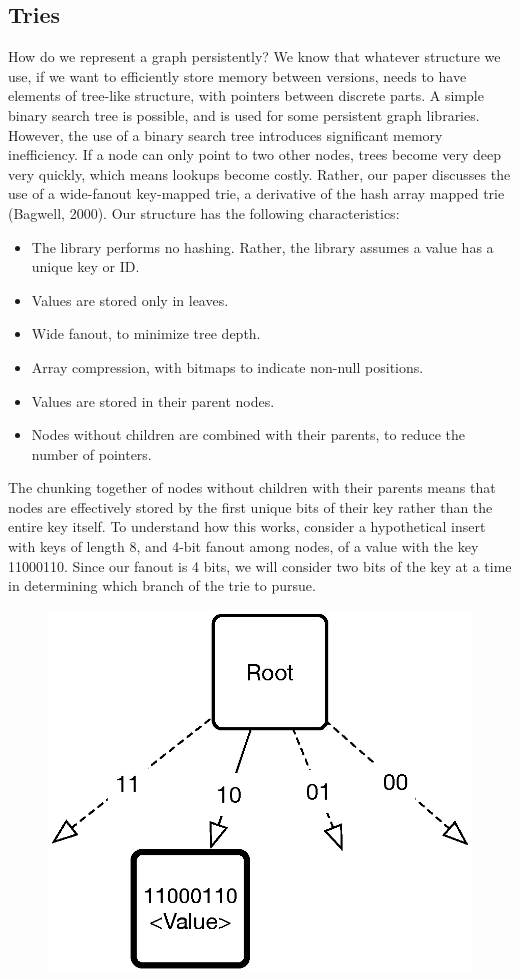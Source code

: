 \documentclass[preprint]{sigplanconf}
\begin{document}
\subsection{Tries}
How do we represent a graph persistently? We know that whatever structure we use, if we want to efficiently store memory between versions, needs to have elements of tree-like structure, with pointers between discrete parts.
A simple binary search tree is possible, and is used for some persistent graph libraries.
However, the use of a binary search tree introduces significant memory inefficiency.
If a node can only point to two other nodes, trees become very deep very quickly, which means lookups become costly.
Rather, our paper discusses the use of a wide-fanout key-mapped trie, a derivative of the hash array mapped trie (Bagwell, 2000).
Our structure has the following characteristics:
\begin{itemize}
\item The library performs no hashing. Rather, the library assumes a value has a unique key or ID.
\item Values are stored only in leaves.
\item Wide fanout, to minimize tree depth.
\item Array compression, with bitmaps to indicate non-null positions.
\item Values are stored in their parent nodes.
\item Nodes without children are combined with their parents, to reduce the number of pointers.
\end{itemize}
The chunking together of nodes without children with their parents means that nodes are effectively stored by the first unique bits of their key rather than the entire key itself.
To understand how this works, consider a hypothetical insert with keys of length 8, and 4-bit fanout among nodes, of a value with the key 11000110.
Since our fanout is 4 bits, we will consider two bits of the key at a time in determining which branch of the trie to pursue.
\begin{figure}[H]
\includegraphics[scale=.5]{trie1}
\centering
\end{figure}
\end{document}
